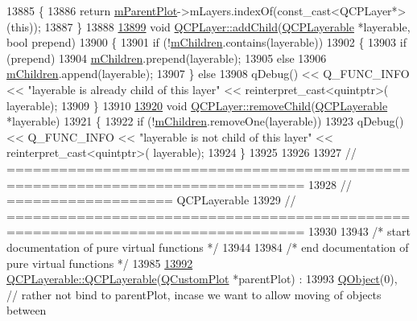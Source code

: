 \begin{DoxyCode}
13885 \textcolor{keyword}{}\{
13886   \textcolor{keywordflow}{return} \hyperlink{a00043_a2f3374a7884bf403720cd1cf6f7ad1bb}{mParentPlot}->mLayers.indexOf(const\_cast<QCPLayer*>(\textcolor{keyword}{this}));
13887 \}
13888 
\hypertarget{a00115_source_l13899}{}\hyperlink{a00043_a57ce5e49364aa9122276d5df3b4a0ddc}{13899} \textcolor{keywordtype}{void} \hyperlink{a00043_a57ce5e49364aa9122276d5df3b4a0ddc}{QCPLayer::addChild}(\hyperlink{a00044}{QCPLayerable} *layerable, \textcolor{keywordtype}{bool} prepend)
13900 \{
13901   \textcolor{keywordflow}{if} (!\hyperlink{a00043_a704aa71bba469383c3a3c598c1ec0d28}{mChildren}.contains(layerable))
13902   \{
13903     \textcolor{keywordflow}{if} (prepend)
13904       \hyperlink{a00043_a704aa71bba469383c3a3c598c1ec0d28}{mChildren}.prepend(layerable);
13905     \textcolor{keywordflow}{else}
13906       \hyperlink{a00043_a704aa71bba469383c3a3c598c1ec0d28}{mChildren}.append(layerable);
13907   \} \textcolor{keywordflow}{else}
13908     qDebug() << Q\_FUNC\_INFO << \textcolor{stringliteral}{"layerable is already child of this layer"} << \textcolor{keyword}{reinterpret\_cast<}quintptr\textcolor{keyword}{>}(
      layerable);
13909 \}
13910 
\hypertarget{a00115_source_l13920}{}\hyperlink{a00043_ac2f64ac7761650582d968d86670ef362}{13920} \textcolor{keywordtype}{void} \hyperlink{a00043_ac2f64ac7761650582d968d86670ef362}{QCPLayer::removeChild}(\hyperlink{a00044}{QCPLayerable} *layerable)
13921 \{
13922   \textcolor{keywordflow}{if} (!\hyperlink{a00043_a704aa71bba469383c3a3c598c1ec0d28}{mChildren}.removeOne(layerable))
13923     qDebug() << Q\_FUNC\_INFO << \textcolor{stringliteral}{"layerable is not child of this layer"} << \textcolor{keyword}{reinterpret\_cast<}quintptr\textcolor{keyword}{>}(
      layerable);
13924 \}
13925 
13926 
13927 \textcolor{comment}{// ================================================================================}
13928 \textcolor{comment}{// =================== QCPLayerable}
13929 \textcolor{comment}{// ================================================================================}
13930 
13943 \textcolor{comment}{/* start documentation of pure virtual functions */}
13944 
13984 \textcolor{comment}{/* end documentation of pure virtual functions */}
13985 
\hypertarget{a00115_source_l13992}{}\hyperlink{a00044_a13db44e350bb2c681d2e31e2208e23f9}{13992} \hyperlink{a00044_a13db44e350bb2c681d2e31e2208e23f9}{QCPLayerable::QCPLayerable}(\hyperlink{a00030_d8/d00/a00186}{QCustomPlot} *parentPlot) :
13993   \hyperlink{a00059}{QObject}(0), \textcolor{comment}{// rather not bind to parentPlot, incase we want to allow moving of objects between
}
\end{DoxyCode}
